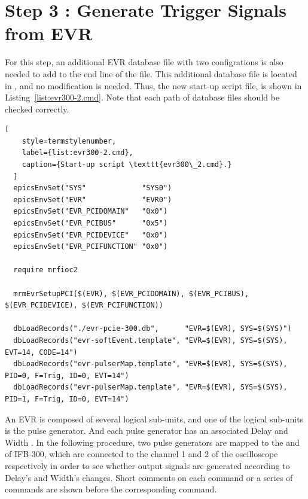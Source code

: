\documentclass[11pt
  , a4paper
  , article
  , oneside
  , showtrims
]{memoir}
\begin{document}
\section{Step 3 : Generate Trigger Signals from EVR}
For this step, an additional EVR database file with two configrations is also needed to add to the end line of the  file. This additional database file is located in , and no modification is needed. Thus, the new start-up script file,  is shown in Listing~\ref{list:evr300-2.cmd}. Note that each path of database files should be checked correctly. 
\begin{lstlisting}[ 
    style=termstylenumber,
    label={list:evr300-2.cmd},
    caption={Start-up script \texttt{evr300\_2.cmd}.}
  ]
  epicsEnvSet("SYS"             "SYS0")
  epicsEnvSet("EVR"             "EVR0")
  epicsEnvSet("EVR_PCIDOMAIN"   "0x0")
  epicsEnvSet("EVR_PCIBUS"      "0x5")
  epicsEnvSet("EVR_PCIDEVICE"   "0x0")
  epicsEnvSet("EVR_PCIFUNCTION" "0x0")
  
  require mrfioc2
  
  mrmEvrSetupPCI($(EVR), $(EVR_PCIDOMAIN), $(EVR_PCIBUS), $(EVR_PCIDEVICE), $(EVR_PCIFUNCTION))
  
  dbLoadRecords("./evr-pcie-300.db",      "EVR=$(EVR), SYS=$(SYS)")
  dbLoadRecords("evr-softEvent.template", "EVR=$(EVR), SYS=$(SYS), EVT=14, CODE=14") 
  dbLoadRecords("evr-pulserMap.template", "EVR=$(EVR), SYS=$(SYS), PID=0, F=Trig, ID=0, EVT=14")
  dbLoadRecords("evr-pulserMap.template", "EVR=$(EVR), SYS=$(SYS), PID=1, F=Trig, ID=0, EVT=14")
\end{lstlisting}

An EVR is composed of several logical sub-units, and one of the logical sub-units is the pulse generator. And each pulse generator has an associated Delay and Width \cite{EVR-USER-GUIDE}. In the following procedure, two pulse generators are mapped to the  and  of IFB-300, which are connected to the channel 1 and 2 of the oscilloscope respectively in order to see whether output signals are generated according to Delay's and Width's changes. Short comments on each command or a series of commands are shown before the corresponding command.
\end{document}

